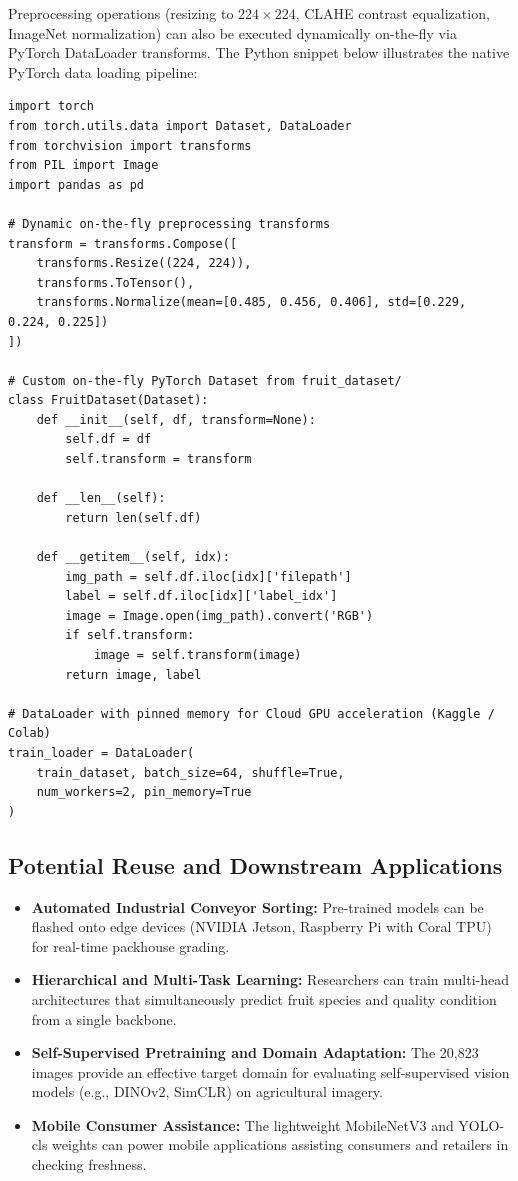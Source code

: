\documentclass[11pt,a4paper]{article}
\begin{document}
Preprocessing operations (resizing to $224 \times 224$, CLAHE contrast equalization, ImageNet normalization) can also be executed dynamically on-the-fly via PyTorch DataLoader transforms. The Python snippet below illustrates the native PyTorch data loading pipeline:

\begin{verbatim}
import torch
from torch.utils.data import Dataset, DataLoader
from torchvision import transforms
from PIL import Image
import pandas as pd

# Dynamic on-the-fly preprocessing transforms
transform = transforms.Compose([
    transforms.Resize((224, 224)),
    transforms.ToTensor(),
    transforms.Normalize(mean=[0.485, 0.456, 0.406], std=[0.229, 0.224, 0.225])
])

# Custom on-the-fly PyTorch Dataset from fruit_dataset/
class FruitDataset(Dataset):
    def __init__(self, df, transform=None):
        self.df = df
        self.transform = transform

    def __len__(self):
        return len(self.df)

    def __getitem__(self, idx):
        img_path = self.df.iloc[idx]['filepath']
        label = self.df.iloc[idx]['label_idx']
        image = Image.open(img_path).convert('RGB')
        if self.transform:
            image = self.transform(image)
        return image, label

# DataLoader with pinned memory for Cloud GPU acceleration (Kaggle / Colab)
train_loader = DataLoader(
    train_dataset, batch_size=64, shuffle=True, 
    num_workers=2, pin_memory=True
)
\end{verbatim}

\subsection{Potential Reuse and Downstream Applications}
\begin{itemize}
    \item \textbf{Automated Industrial Conveyor Sorting:} Pre-trained models can be flashed onto edge devices (NVIDIA Jetson, Raspberry Pi with Coral TPU) for real-time packhouse grading.
    \item \textbf{Hierarchical and Multi-Task Learning:} Researchers can train multi-head architectures that simultaneously predict fruit species and quality condition from a single backbone.
    \item \textbf{Self-Supervised Pretraining and Domain Adaptation:} The 20,823 images provide an effective target domain for evaluating self-supervised vision models (e.g., DINOv2, SimCLR) on agricultural imagery.
    \item \textbf{Mobile Consumer Assistance:} The lightweight MobileNetV3 and YOLO-cls weights can power mobile applications assisting consumers and retailers in checking freshness.
\end{itemize}
\end{document}
